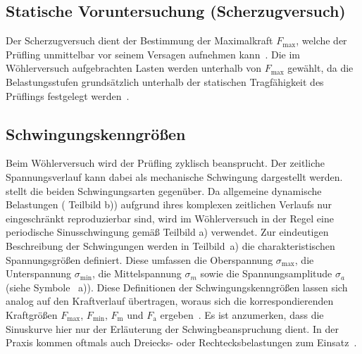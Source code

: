 	\subsection{Statische Voruntersuchung (Scherzugversuch)} \label{chap:Theorie_Scherzugversuch}
	Der Scherzugversuch dient der Bestimmung der Maximalkraft $F_{\text{max}}$, welche der Prüfling unmittelbar vor seinem Versagen aufnehmen kann~\cite[Seite~216--218]{RoloffMatek2021}. Die im Wöhlerversuch aufgebrachten Lasten werden unterhalb von $F_{\text{max}}$ gewählt, da die Belastungsstufen grundsätzlich unterhalb der statischen Tragfähigkeit des Prüflings festgelegt werden~\cite[Seite~272]{Werkstofftechnik-Praktikum2021}.
	
	\subsection{Schwingungskenngrößen}
 Beim Wöhlerversuch wird der Prüfling zyklisch beansprucht. Der zeitliche Spannungsverlauf kann dabei als mechanische Schwingung dargestellt werden.  stellt die beiden Schwingungsarten gegenüber. 
 Da allgemeine dynamische Belastungen  ( Teilbild b)) aufgrund ihres komplexen zeitlichen Verlaufs nur eingeschränkt reproduzierbar sind, wird im Wöhlerversuch in der Regel eine periodische Sinusschwingung gemäß  Teilbild a) verwendet.
Zur eindeutigen Beschreibung der Schwingungen werden in Teilbild~a) die charakteristischen Spannungsgrößen definiert. Diese umfassen die Oberspannung $\sigma_{\text{max}}$, die Unterspannung $\sigma_{\text{min}}$, die Mittelspannung $\sigma_m$ sowie die Spannungsamplitude $\sigma_a$ (siehe Symbole ~a)). Diese Definitionen der Schwingungskenngrößen lassen sich analog auf den Kraftverlauf übertragen, woraus sich die korrespondierenden Kraftgrößen $F_{\text{max}}$, $F_{\text{min}}$, $F_{\text{m}}$ und $F_{\text{a}}$ ergeben~\cite[Seite 269--270]{Werkstofftechnik-Praktikum2021}. 
Es ist anzumerken, dass die Sinuskurve hier nur der Erläuterung der Schwingbeanspruchung dient. In der Praxis kommen oftmals auch Dreiecks- oder Rechtecksbelastungen zum Einsatz~\cite[Seite~23]{Haibach2006}. 

